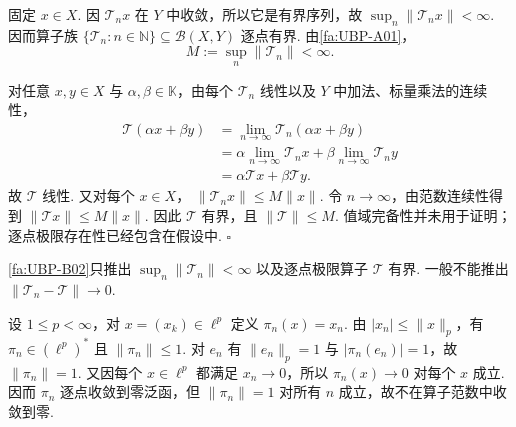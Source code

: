 \begin{FAProof}
固定 \(\displaystyle x\in X\). 因 \(\displaystyle \mathcal T_nx\) 在 \(\displaystyle Y\) 中收敛，所以它是有界序列，故 \(\displaystyle \sup_n\|\mathcal T_nx\|<\infty\). 因而算子族 \(\displaystyle \{\mathcal T_n:n\in\mathbb N\}\subseteq\mathcal B(X,Y)\) 逐点有界. 由\autoref{fa:UBP-A01}，
\[
M:=\sup_n\|\mathcal T_n\|<\infty.
\]

对任意 \(\displaystyle x,y\in X\) 与 \(\displaystyle \alpha,\beta\in\mathbb K\)，由每个 \(\displaystyle \mathcal T_n\) 线性以及 \(\displaystyle Y\) 中加法、标量乘法的连续性，
\[
\begin{aligned}
\displaystyle \mathcal T(\alpha x+\beta y)
&\displaystyle =\lim_{n\to\infty}\mathcal T_n(\alpha x+\beta y)\\
&\displaystyle =\alpha\lim_{n\to\infty}\mathcal T_nx+\beta\lim_{n\to\infty}\mathcal T_ny\\
&\displaystyle =\alpha\mathcal T x+\beta\mathcal T y.
\end{aligned}
\]
故 \(\displaystyle \mathcal T\) 线性. 又对每个 \(\displaystyle x\in X\)，
\(\displaystyle \|\mathcal T_nx\|\leqslant M\|x\|\).
令 \(\displaystyle n\to\infty\)，由范数连续性得到 \(\displaystyle \|\mathcal T x\|\leqslant M\|x\|\). 因此 \(\displaystyle \mathcal T\) 有界，且 \(\displaystyle \|\mathcal T\|\leqslant M\). 值域完备性并未用于证明；逐点极限存在性已经包含在假设中.
\hfill\(\square\)
\end{FAProof}

\begin{FAWarning}[逐点收敛不能自动升级为算子范数收敛]
\autoref{fa:UBP-B02}只推出 \(\displaystyle \sup_n\|\mathcal T_n\|<\infty\) 以及逐点极限算子 \(\displaystyle \mathcal T\) 有界. 一般不能推出 \(\displaystyle \|\mathcal T_n-\mathcal T\|\to0\).
\end{FAWarning}

\begin{FAExample}[坐标泛函]\label{i08:ellp-coordinate}
设 \(\displaystyle 1\leqslant p<\infty\)，对 \(\displaystyle x=(x_k)\in\ell^p\) 定义 \(\displaystyle \pi_n(x)=x_n\). 由 \(\displaystyle |x_n|\leqslant\|x\|_p\)，有 \(\displaystyle \pi_n\in(\ell^p)^*\) 且 \(\displaystyle \|\pi_n\|\leqslant1\). 对 \(\displaystyle e_n\) 有 \(\displaystyle \|e_n\|_p=1\) 与 \(\displaystyle |\pi_n(e_n)|=1\)，故 \(\displaystyle \|\pi_n\|=1\). 又因每个 \(\displaystyle x\in\ell^p\) 都满足 \(\displaystyle x_n\to0\)，所以 \(\displaystyle \pi_n(x)\to0\) 对每个 \(\displaystyle x\) 成立. 因而 \(\displaystyle \pi_n\) 逐点收敛到零泛函，但 \(\displaystyle \|\pi_n\|=1\) 对所有 \(\displaystyle n\) 成立，故不在算子范数中收敛到零.
\end{FAExample}

